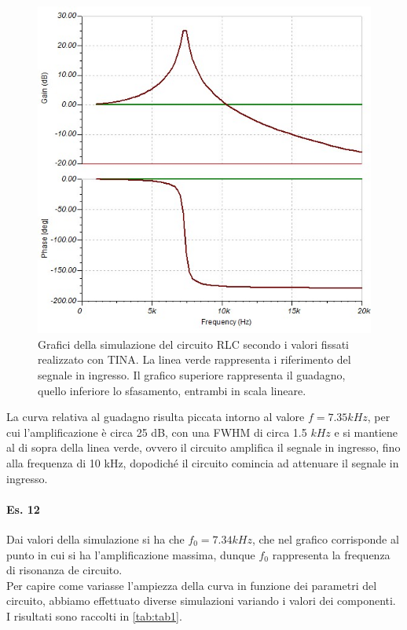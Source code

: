 \documentclass[journal, a4paper]{IEEEtran}
\begin{document}
\begin{figure}[htp]
\caption{Grafici della simulazione del circuito RLC secondo i valori fissati realizzato con TINA. La linea verde rappresenta i riferimento del segnale in ingresso. Il grafico superiore rappresenta il guadagno, quello inferiore lo sfasamento, entrambi in scala lineare.}
\label{fig:fig1}
\centering
\includegraphics[scale=.4]{tinadiag}
\end{figure}

La curva relativa al guadagno risulta piccata intorno al valore $f=7.35 kHz$, per cui l'amplificazione è circa 25 dB, con una FWHM di circa 1.5 $kHz$ e si mantiene al di sopra della linea verde, ovvero il circuito amplifica il segnale in ingresso, fino alla frequenza di 10 kHz, dopodiché il circuito comincia ad attenuare il segnale in ingresso.

\paragraph{Es. 12}
Dai valori della simulazione si ha che $f_0 = 7.34 kHz$, che nel grafico corrisponde al punto in cui si ha l'amplificazione massima, dunque $f_0$ rappresenta la frequenza di risonanza de circuito.\\
Per capire come variasse l'ampiezza della curva in funzione dei parametri del circuito, abbiamo effettuato diverse simulazioni variando i valori dei componenti. I risultati sono raccolti in
\ref{tab:tab1}.
\end{document}
